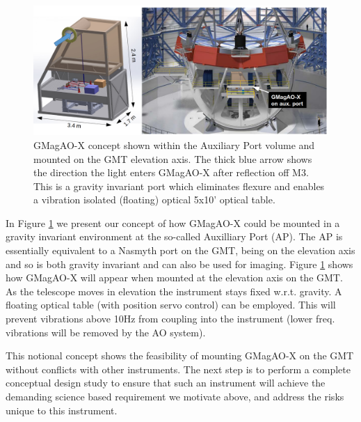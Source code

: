 \documentclass[12pt,preprint]{aastex}
\begin{document}
\begin{figure}[h!]
\centering
\includegraphics[width=6in]{figures/ap.png}
\vspace{-0.1in}
\caption{ GMagAO-X concept shown within the Auxiliary Port volume and mounted on the GMT elevation axis. The thick blue arrow shows the direction the light enters GMagAO-X after reflection off M3. This is a gravity invariant port which eliminates flexure and enables a vibration isolated (floating) optical 5x10' optical table. \label{fig:ap}}
\vspace{-0.1in}
\end{figure}

In Figure \ref{fig:ap} we present our concept of how GMagAO-X could be mounted in a gravity invariant environment at the so-called Auxilliary Port (AP). The AP is essentially equivalent to a Nasmyth port on the GMT, being on the elevation axis and so is both gravity invariant and can also be used for imaging.  Figure \ref{fig:ap} shows how GMagAO-X will appear when mounted at the elevation axis on the GMT. As the telescope moves in elevation the instrument stays fixed w.r.t. gravity. A floating optical table (with position servo control) can be employed.  This will prevent vibrations above 10Hz from coupling into the instrument (lower freq. vibrations will be removed by the AO system). 

This notional concept shows the feasibility of mounting GMagAO-X on the GMT without conflicts with other instruments.  The next step is to perform a complete conceptual design study to ensure that such an instrument will achieve the demanding science based requirement we motivate above, and address the risks unique to this instrument. 
\end{document}
